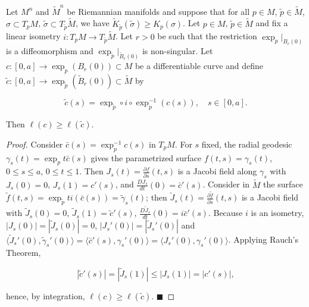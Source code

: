 \begin{proposition}[Proposition 2.5]
  \label{prop:dc-ch10-2-5}
  Let $M^n$ and $\widetilde{M}^n$ be Riemannian manifolds and suppose that for all
  $p\in M$, $\tilde p\in\widetilde{M}$, $\sigma\subset T_pM$, $\tilde\sigma\subset T_{\tilde p}\widetilde{M}$,
  we have $\widetilde{K}_{\tilde p}(\tilde\sigma)\geq K_p(\sigma)$. Let $p\in M$,
  $\tilde p\in\widetilde{M}$ and fix a linear isometry $i:T_pM\to T_{\tilde p}\widetilde{M}$.
  Let $r>0$ be such that the restriction $\exp_p|_{B_r(0)}$ is a diffeomorphism and
  $\exp_{\tilde p}|_{\tilde B_r(0)}$ is non-singular. Let $c:[0,a]\to\exp_p(B_r(0))\subset M$
  be a differentiable curve and define $\tilde c:[0,a]\to\exp_{\tilde p}(\tilde B_r(0))\subset\widetilde{M}$
  by
  
  $$
  \tilde c(s)=\exp_{\tilde p}\circ i\circ\exp_p^{-1}(c(s)),\quad s\in[0,a].
  $$
  
  Then $\ell(c)\geq\ell(\tilde c)$.
\end{proposition}
\begin{proof}
  Consider $\bar c(s)=\exp_p^{-1}c(s)$ in $T_pM$. For $s$ fixed, the radial
  geodesic $\gamma_s(t)=\exp_p t\bar c(s)$ gives the parametrized surface
  $f(t,s)=\gamma_s(t)$, $0\leq s\leq a$, $0\leq t\leq 1$. Then $J_s(t)=\frac{\partial f}{\partial s}(t,s)$
  is a Jacobi field along $\gamma_s$ with $J_s(0)=0$, $J_s(1)=c'(s)$, and
  $\frac{DJ_s}{dt}(0)=\bar c'(s)$. Consider in $\widetilde{M}$ the surface
  $\tilde f(t,s)=\exp_{\tilde p}ti(\bar c(s))=\tilde\gamma_s(t)$; then $\tilde J_s(t)=\frac{\partial\tilde f}{\partial s}(t,s)$
  is a Jacobi field with $\tilde J_s(0)=0$, $\tilde J_s(1)=\tilde c'(s)$,
  $\frac{D\tilde J_s}{dt}(0)=i\bar c'(s)$. Because $i$ is an isometry,
  $|J_s(0)|=|\tilde J_s(0)|=0$, $|J_s'(0)|=|\tilde J_s'(0)|$ and
  $\langle\tilde J_s'(0),\tilde\gamma_s'(0)\rangle=\langle\bar c'(s),\gamma_s'(0)\rangle=\langle J_s'(0),\gamma_s'(0)\rangle$.
  Applying Rauch's Theorem,
  
  $$
  |\tilde c'(s)|=|\tilde J_s(1)|\leq|J_s(1)|=|c'(s)|,
  $$
  
  hence, by integration, $\ell(c)\geq\ell(\tilde c)$. $\blacksquare$
\end{proof}

